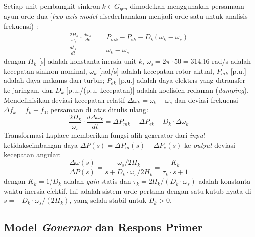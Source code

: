 Setiap unit pembangkit sinkron $k\in G_{gen}$ dimodelkan menggunakan persamaan ayun orde dua (\textit{two-axis model} disederhanakan menjadi orde satu untuk analisis frekuensi) \cite{Kundur1994}:
\begin{equation}
    \begin{aligned}
        \frac{2H_{k}}{\omega_{s}} \cdot \frac{d\omega_{k}}{dt} &= P_{mk} - P_{ek} - D_{k}(\omega_{k}-\omega_{s}) \\
        \frac{d\delta_{k}}{dt} &= \omega_{k}-\omega_{s}
    \end{aligned}
\end{equation}
dengan $H_{k}$ [s] adalah konstanta inersia unit $k$, $\omega_{s}=2\pi\cdot 50=314.16$ rad/s adalah kecepatan sinkron nominal, $\omega_{k}$ [rad/s] adalah kecepatan rotor aktual, $P_{mk}$ [p.u.] adalah daya mekanis dari turbin; $P_{ek}$ [p.u.] adalah daya elektris yang ditransfer ke jaringan, dan $D_{k}$ [p.u./(p.u. kecepatan)] adalah koefisien redaman (\textit{damping}). Mendefinisikan deviasi kecepatan relatif $\Delta\omega_{k}=\omega_{k}-\omega_{s}$ dan deviasi frekuensi $\Delta f_{k}=f_{k}-f_{0}$, persamaan di atas ditulis ulang:
\begin{equation}
    \frac{2H_{k}}{\omega_{s}} \cdot \frac{d\Delta\omega_{k}}{dt} = \Delta P_{mk} - \Delta P_{ek} - D_{k}\cdot\Delta\omega_{k}
\end{equation}
Transformasi Laplace memberikan fungsi alih generator dari \textit{input} ketidakseimbangan daya $\Delta P(s)=\Delta P_{m}(s)-\Delta P_{e}(s)$ ke \textit{output} deviasi kecepatan angular:
\begin{equation}
    \frac{\Delta\omega(s)}{\Delta P(s)} = \frac{\omega_{s}/2H_{k}}{s + D_{k}\cdot\omega_{s}/2H_{k}} = \frac{K_{k}}{\tau_{k}\cdot s + 1}
\end{equation}
dengan $K_{k}=1/D_{k}$ adalah \textit{gain} statis dan $\tau_{k}=2H_{k}/(D_{k}\cdot\omega_{s})$ adalah konstanta waktu inersia efektif. Ini adalah sistem orde pertama dengan satu kutub nyata di $s=-D_{k}\cdot\omega_{s}/(2H_{k})$, yang selalu stabil untuk $D_{k}>0$.

\subsection{Model \textit{Governor} dan Respons Primer}
\label{subsec:Model_Governor}

